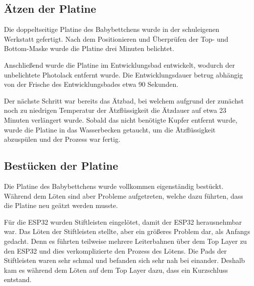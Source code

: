 \subsection{Ätzen der Platine}
Die doppeltseitige Platine des Babybettchens wurde in der schuleigenen Werkstatt gefertigt. 
Nach dem Positionieren und Überprüfen der Top- und Bottom-Maske wurde die Platine drei Minuten belichtet.

\par\vspace{1em}

\noindent 
Anschließend wurde die Platine im Entwicklungsbad entwickelt, wodurch der unbelichtete Photolack entfernt wurde.
Die Entwicklungsdauer betrug abhängig von der Frische des Entwicklungsbades etwa 90 Sekunden.

\par\vspace{1em}

\noindent 
Der nächste Schritt war bereits das Ätzbad, bei welchem aufgrund der zunächst noch zu niedrigen Temperatur der Ätzflüssigkeit die Ätzdauer auf etwa 23 Minuten verlängert wurde.
Sobald das nicht benötigte Kupfer entfernt wurde, wurde die Platine in das Wasserbecken getaucht, um die Ätzflüssigkeit abzuspülen und der Prozess war fertig.



\subsection{Bestücken der Platine}
Die Platine des Babybettchens wurde vollkommen eigenständig bestückt. Während dem Löten sind aber Probleme aufgetreten, welche dazu führten, dass die Platine neu geätzt werden musste. 

\par\vspace{1em}

\noindent
Für die ESP32 wurden Stiftleisten eingelötet, damit der ESP32 herausnehmbar war. Das Löten der Stiftleisten stellte, aber ein größeres Problem dar, als Anfangs gedacht. Denn es führten teilweise mehrere Leiterbahnen über dem Top Layer zu den ESP32 und dies verkomplizierte den Prozess des Lötens. 
Die Pads der Stiftleisten waren sehr schmal und befanden sich sehr nah bei einander. Deshalb kam es während dem Löten auf dem Top Layer dazu, dass ein Kurzschluss entstand. 

